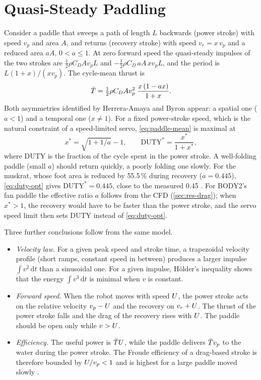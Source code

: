 \section{Quasi-Steady Paddling}
\label{sec:fund-paddle}

Consider a paddle that sweeps a path of length $L$ backwards (power stroke) with speed $v_p$ and area
$A$, and returns (recovery stroke) with speed $v_r=x\,v_p$ and a reduced area $aA$, $0<a\le 1$. At zero
forward speed the quasi-steady impulses of the two strokes are $\tfrac12\rho C_D A v_p L$ and
$-\tfrac12\rho C_D\,aA\,x v_p L$, and the period is $L(1+x)/(x v_p)$. The cycle-mean thrust is
\begin{equation}
  \bar{T} = \tfrac12\rho C_D A v_p^2\;\frac{x\,(1-a x)}{1+x}.
  \label{eq:paddle-mean}
\end{equation}
Both asymmetries identified by Herrera-Amaya and Byron \cite{HerreraAmaya2024} appear: a spatial one ($a<1$)
and a temporal one ($x\neq1$). For a fixed power-stroke speed, which is the natural constraint of a
speed-limited servo, \eqref{eq:paddle-mean} is maximal at
\begin{equation}
  x^* = \sqrt{1+1/a}-1, \qquad \mathrm{DUTY}^* = \frac{x^*}{1+x^*},
  \label{eq:duty-opt}
\end{equation}
where DUTY is the fraction of the cycle spent in the power stroke. A well-folding paddle (small $a$) should
return quickly, a poorly folding one slowly. For the muskrat, whose foot area is reduced by 55.5\,\% during
recovery ($a=0.445$), \eqref{eq:duty-opt} gives $\mathrm{DUTY}^*=0.445$, close to the measured 0.45
\cite{Fish1984}. For BODY2's fan paddle the effective ratio $a$ follows from the CFD
(\cref{sec:res-drag}); when $x^*>1$, the recovery would have to be faster than the power stroke, and the
servo speed limit then sets DUTY instead of \eqref{eq:duty-opt}.

Three further conclusions follow from the same model.
\begin{itemize}
  \item \emph{Velocity law.} For a given peak speed and stroke time, a trapezoidal velocity profile (short
        ramps, constant speed in between) produces a larger impulse $\int v^2\,\mathrm dt$ than a sinusoidal
        one. For a given impulse, H\"older's inequality shows that the energy $\int v^3\,\mathrm dt$ is
        minimal when $v$ is constant.
  \item \emph{Forward speed.} When the robot moves with speed $U$, the power stroke acts on the relative
        velocity $v_p-U$ and the recovery on $v_r+U$. The thrust of the power stroke falls and the drag of
        the recovery rises with $U$. The paddle should be open only while $v>U$.
  \item \emph{Efficiency.} The useful power is $\bar{T}U$, while the paddle delivers $\bar{T} v_p$ to the water during
        the power stroke. The Froude efficiency of a drag-based stroke is therefore bounded by
        $U/v_p<1$ and is highest for a large paddle moved slowly \cite{Fish1996,Walker2000}.
\end{itemize}


